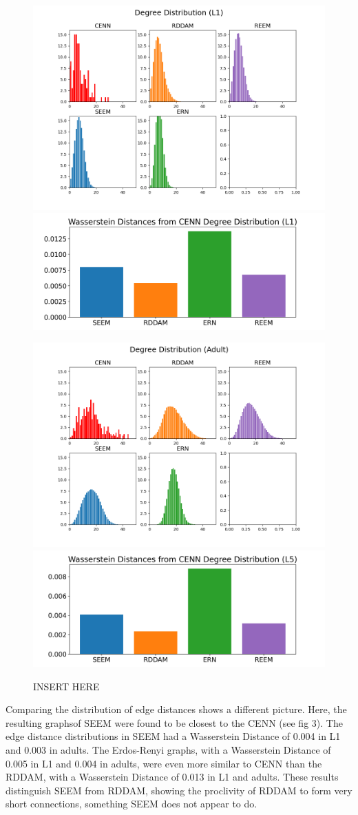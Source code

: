 \begin{figure}[h]
    \includegraphics[width=0.75\linewidth]{data/images/distributions/degreeDist_W1_Rand.png}
    \includegraphics[width=0.24\linewidth]{data/images/compareDistributions/wassersteinDistances_Degree_L1_2.png}

    \includegraphics[width=0.75\linewidth]{data/images/distributions/degreeDist_L5_Rand.png}
    \includegraphics[width=0.24\linewidth]{data/images/compareDistributions/wassersteinDistances_Degree_L5_2.png}
  \caption{INSERT HERE}
\end{figure}

Comparing the distribution of edge distances shows a different picture. Here, the resulting graphsof SEEM were found to be closest to the CENN (see fig 3). The edge distance distributions in SEEM had a Wasserstein Distance of 0.004 in L1 and 0.003 in adults. The Erdos-Renyi graphs, with a Wasserstein Distance of 0.005 in L1 and 0.004 in adults, were even more similar to CENN than the RDDAM, with a Wasserstein Distance of 0.013 in L1 and adults. These results distinguish SEEM from RDDAM, showing the proclivity of RDDAM to form very short connections, something SEEM does not appear to do.

